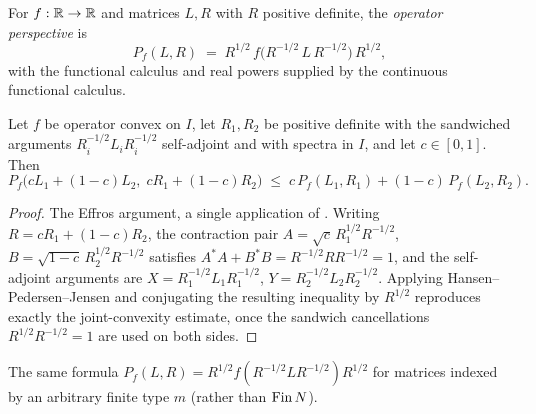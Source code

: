 \begin{definition}\label{operatorPerspective}
  \leanok
  For \(f:\mathbb{R}\to\mathbb{R}\) and matrices \(L,R\) with \(R\) positive definite, the \emph{operator
  perspective} is
  \[
    P_f(L,R) \;=\; R^{1/2}\,f\bigl(R^{-1/2}\,L\,R^{-1/2}\bigr)\,R^{1/2},
  \]
  with the functional calculus and real powers supplied by the continuous functional calculus.
\end{definition}

\begin{theorem}\label{operatorPerspective_jointly_convex}
  \leanok
  Let \(f\) be operator convex on \(I\), let \(R_1,R_2\) be positive definite with the sandwiched
  arguments \(R_i^{-1/2}L_iR_i^{-1/2}\) self-adjoint and with spectra in \(I\), and let
  \(c\in[0,1]\). Then
  \[
    P_f\bigl(cL_1 + (1-c)L_2,\;cR_1 + (1-c)R_2\bigr) \;\le\;
      c\,P_f(L_1,R_1) + (1-c)\,P_f(L_2,R_2).
  \]
\end{theorem}
\begin{proof}\leanok
  The Effros argument, a single application of . Writing \(R = cR_1 + (1-c)R_2\),
  the contraction pair \(A = \sqrt{c}\,R_1^{1/2}R^{-1/2}\), \(B = \sqrt{1-c}\,R_2^{1/2}R^{-1/2}\)
  satisfies \(A^{*}A + B^{*}B = R^{-1/2}RR^{-1/2} = 1\), and the self-adjoint arguments are
  \(X = R_1^{-1/2}L_1R_1^{-1/2}\), \(Y = R_2^{-1/2}L_2R_2^{-1/2}\). Applying
  Hansen--Pedersen--Jensen and conjugating the resulting inequality by \(R^{1/2}\) reproduces
  exactly the joint-convexity estimate, once the sandwich cancellations \(R^{1/2}R^{-1/2} = 1\)
  are used on both sides.
\end{proof}

\begin{definition}\label{opPersp}
  \leanok
  The same formula \(P_f(L,R) = R^{1/2}f(R^{-1/2}LR^{-1/2})R^{1/2}\) for matrices indexed by an
  arbitrary finite type \(m\) (rather than \(\operatorname{Fin} N\)).
\end{definition}

